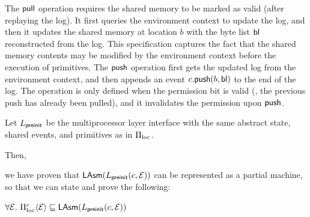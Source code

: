 The $\mathsf{pull}$ operation requires the shared memory to be marked as valid
(after replaying the log). It first queries the environment context to update
the log, and then it updates the shared memory at location $b$ with the byte
list $\mathsf{bl}$ reconstructed from the log. This specification
captures the fact that the shared memory contents may be
modified by the environment context before the execution of
primitives. 
The $\mathsf{push}$ operation first gets the updated log from the environment context,
and then appends an event $c.\mathsf{push}(b,\mathsf{bl})$ to the end of the log.
The operation is only defined when the permission bit is valid (\ie, the previous push
has already been pulled), and it invalidates the permission upon $\mathsf{push}$.

Let $L_{\mathsf{preinit}}$ be the multiprocessor layer interface with the same abstract state, shared events, and primitives as in $\Pi_{\text{loc}}$.
Then, we
have proven that $\mathsf{LAsm}(L_{\mathsf{preinit}}(c, \mathcal{E}))$ can be represented as a
partial machine, so that we can state and prove the following:
 \begin{lemma}
$ \forall \mathcal{E}.\ \Pi_{\text{loc}}^c\langle \mathcal{E} \rangle \sqsubseteq \mathsf{LAsm}(L_{\mathsf{preinit}}(c, \mathcal{E})) $
 \end{lemma}

